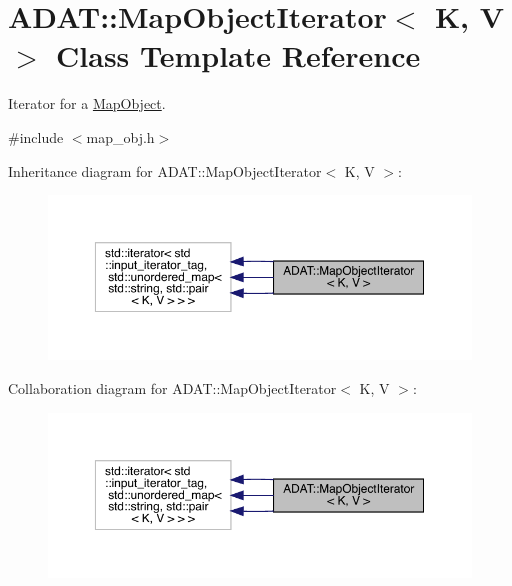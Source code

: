 \hypertarget{classADAT_1_1MapObjectIterator}{}\section{A\+D\+AT\+:\+:Map\+Object\+Iterator$<$ K, V $>$ Class Template Reference}
\label{classADAT_1_1MapObjectIterator}


Iterator for a \mbox{\hyperlink{classADAT_1_1MapObject}{Map\+Object}}.  




{\ttfamily \#include $<$map\+\_\+obj.\+h$>$}



Inheritance diagram for A\+D\+AT\+:\+:Map\+Object\+Iterator$<$ K, V $>$\+:
\nopagebreak
\begin{figure}[H]
\begin{center}
\leavevmode
\includegraphics[width=350pt]{dd/d7a/classADAT_1_1MapObjectIterator__inherit__graph}
\end{center}
\end{figure}


Collaboration diagram for A\+D\+AT\+:\+:Map\+Object\+Iterator$<$ K, V $>$\+:
\nopagebreak
\begin{figure}[H]
\begin{center}
\leavevmode
\includegraphics[width=350pt]{dc/d14/classADAT_1_1MapObjectIterator__coll__graph}
\end{center}
\end{figure}
